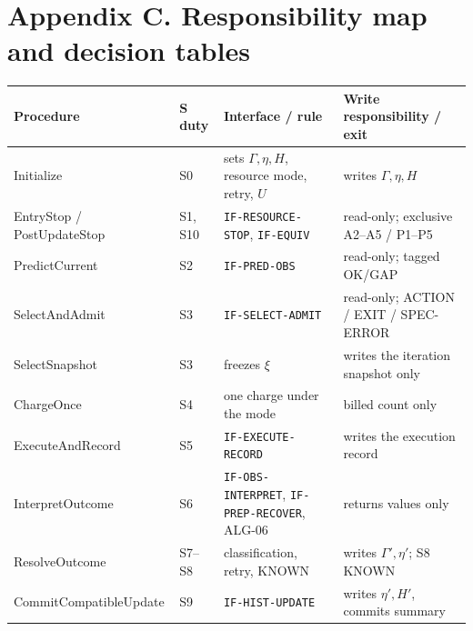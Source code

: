 \section*{Appendix C. Responsibility map and decision tables}
\label{app:cltav-tables}

\begin{table}[H]
\centering
\small
\begin{tabular}{@{}p{4.4cm}p{2.6cm}p{4.0cm}p{4.4cm}@{}}
\hline
Procedure & S duty & Interface / rule & Write responsibility / exit \\
\hline
Initialize & S0 & sets $\Gamma,\eta,H$, resource mode, retry, $U$ & writes $\Gamma,\eta,H$ \\
EntryStop / PostUpdateStop & S1, S10 & \texttt{IF-RESOURCE-STOP}, \texttt{IF-EQUIV} & read-only; exclusive A2--A5 / P1--P5 \\
PredictCurrent & S2 & \texttt{IF-PRED-OBS} & read-only; tagged OK/GAP \\
SelectAndAdmit & S3 & \texttt{IF-SELECT-ADMIT} & read-only; ACTION / EXIT / SPEC-ERROR \\
SelectSnapshot & S3 & freezes $\xi$ & writes the iteration snapshot only \\
ChargeOnce & S4 & one charge under the mode & billed count only \\
ExecuteAndRecord & S5 & \texttt{IF-EXECUTE-RECORD} & writes the execution record \\
InterpretOutcome & S6 & \texttt{IF-OBS-INTERPRET}, \texttt{IF-PREP-RECOVER}, ALG-06 & returns values only \\
ResolveOutcome & S7--S8 & classification, retry, KNOWN & writes $\Gamma',\eta'$; S8 KNOWN \\
CommitCompatibleUpdate & S9 & \texttt{IF-HIST-UPDATE} & writes $\eta',H'$, commits summary \\
\hline
\end{tabular}
\end{table}

